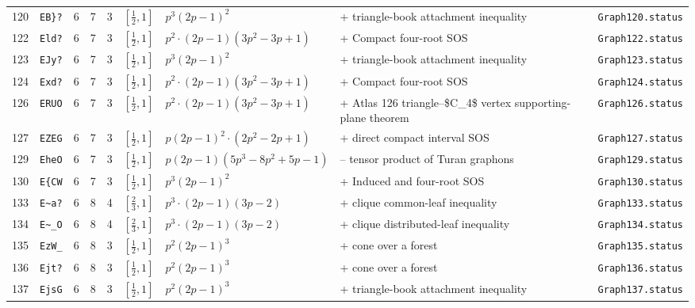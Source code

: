 \begin{landscape}
\begin{longtable}{r l r r r l p{4.0cm} p{3.5cm} p{2.7cm}}
120 & \texttt{EB\}?} & 6 & 7 & 3 & $[\frac{1}{2},1]$ & $p^{3} \left(2 p - 1\right)^{2}$ & + triangle-book attachment inequality & \texttt{Graph120.status}\\
122 & \texttt{Eld?} & 6 & 7 & 3 & $[\frac{1}{2},1]$ & $p^{2} \cdot \left(2 p - 1\right) \left(3 p^{2} - 3 p + 1\right)$ & + Compact four-root SOS & \texttt{Graph122.status}\\
123 & \texttt{EJy?} & 6 & 7 & 3 & $[\frac{1}{2},1]$ & $p^{3} \left(2 p - 1\right)^{2}$ & + triangle-book attachment inequality & \texttt{Graph123.status}\\
124 & \texttt{Exd?} & 6 & 7 & 3 & $[\frac{1}{2},1]$ & $p^{2} \cdot \left(2 p - 1\right) \left(3 p^{2} - 3 p + 1\right)$ & + Compact four-root SOS & \texttt{Graph124.status}\\
126 & \texttt{ERUO} & 6 & 7 & 3 & $[\frac{1}{2},1]$ & $p^{2} \cdot \left(2 p - 1\right) \left(3 p^{2} - 3 p + 1\right)$ & + Atlas 126 triangle--\$C\_4\$ vertex supporting-plane theorem & \texttt{Graph126.status}\\
127 & \texttt{EZEG} & 6 & 7 & 3 & $[\frac{1}{2},1]$ & $p \left(2 p - 1\right)^{2} \cdot \left(2 p^{2} - 2 p + 1\right)$ & + direct compact interval SOS & \texttt{Graph127.status}\\
129 & \texttt{EheO} & 6 & 7 & 3 & $[\frac{1}{2},1]$ & $p \left(2 p - 1\right) \left(5 p^{3} - 8 p^{2} + 5 p - 1\right)$ & -- tensor product of Turan graphons & \texttt{Graph129.status}\\
130 & \texttt{E\{CW} & 6 & 7 & 3 & $[\frac{1}{2},1]$ & $p^{3} \left(2 p - 1\right)^{2}$ & + Induced and four-root SOS & \texttt{Graph130.status}\\
133 & \texttt{E\textasciitilde{}a?} & 6 & 8 & 4 & $[\frac{2}{3},1]$ & $p^{3} \cdot \left(2 p - 1\right) \left(3 p - 2\right)$ & + clique common-leaf inequality & \texttt{Graph133.status}\\
134 & \texttt{E\textasciitilde{}\_O} & 6 & 8 & 4 & $[\frac{2}{3},1]$ & $p^{3} \cdot \left(2 p - 1\right) \left(3 p - 2\right)$ & + clique distributed-leaf inequality & \texttt{Graph134.status}\\
135 & \texttt{EzW\_} & 6 & 8 & 3 & $[\frac{1}{2},1]$ & $p^{2} \left(2 p - 1\right)^{3}$ & + cone over a forest & \texttt{Graph135.status}\\
136 & \texttt{Ejt?} & 6 & 8 & 3 & $[\frac{1}{2},1]$ & $p^{2} \left(2 p - 1\right)^{3}$ & + cone over a forest & \texttt{Graph136.status}\\
137 & \texttt{EjsG} & 6 & 8 & 3 & $[\frac{1}{2},1]$ & $p^{2} \left(2 p - 1\right)^{3}$ & + triangle-book attachment inequality & \texttt{Graph137.status}\\

\end{longtable}
\end{landscape}
